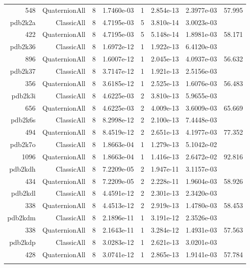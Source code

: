 \begin{xltabular}{\textwidth}{r|rcS[table-format=1.4e+2]cS[table-format=1.3e+2]S[table-format=1.4e+2]S[table-format=-1.3]}
548 & QuaternionAll & 8 & 1.7460e-03 & 1 & 2.854e-13 & 2.3977e-03 & 57.995\\  \addlinespace
pdb2k2a & ClassicAll & 8 & 4.7195e-03 & 5 & 3.810e-14 & 3.0023e-03 & \\
422 & QuaternionAll & 8 & 4.7195e-03 & 5 & 5.148e-14 & 1.8981e-03 & 58.171\\  \addlinespace
pdb2k36 & ClassicAll & 8 & 1.6972e-12 & 1 & 1.922e-13 & 6.4120e-03 & \\
896 & QuaternionAll & 8 & 1.6007e-12 & 1 & 2.045e-13 & 4.0937e-03 & 56.632\\  \addlinespace
pdb2k37 & ClassicAll & 8 & 3.7147e-12 & 1 & 1.921e-13 & 2.5156e-03 & \\
356 & QuaternionAll & 8 & 3.6185e-12 & 1 & 2.525e-13 & 1.6076e-03 & 56.483\\  \addlinespace
pdb2k3i & ClassicAll & 8 & 4.6225e-03 & 2 & 3.810e-13 & 5.9655e-03 & \\
656 & QuaternionAll & 8 & 4.6225e-03 & 2 & 4.009e-13 & 3.6009e-03 & 65.669\\  \addlinespace
pdb2k6s & ClassicAll & 8 & 8.2998e-12 & 2 & 2.100e-13 & 7.4448e-03 & \\
494 & QuaternionAll & 8 & 8.4519e-12 & 2 & 2.651e-13 & 4.1977e-03 & 77.352\\  \addlinespace
pdb2k7o & ClassicAll & 8 & 1.8663e-04 & 1 & 1.279e-13 & 5.1042e-02 & \\
1096 & QuaternionAll & 8 & 1.8663e-04 & 1 & 1.416e-13 & 2.6472e-02 & 92.816\\  \addlinespace
pdb2kdh & ClassicAll & 8 & 7.2209e-05 & 2 & 1.947e-11 & 3.1157e-03 & \\
434 & QuaternionAll & 8 & 7.2209e-05 & 2 & 2.228e-11 & 1.9604e-03 & 58.926\\  \addlinespace
pdb2kdl & ClassicAll & 8 & 4.4591e-12 & 2 & 2.301e-13 & 2.3420e-03 & \\
338 & QuaternionAll & 8 & 4.4513e-12 & 2 & 2.919e-13 & 1.4780e-03 & 58.453\\  \addlinespace
pdb2kdm & ClassicAll & 8 & 2.1896e-11 & 1 & 3.191e-12 & 2.3526e-03 & \\
338 & QuaternionAll & 8 & 2.1643e-11 & 1 & 3.284e-12 & 1.4931e-03 & 57.563\\  \addlinespace
pdb2kdp & ClassicAll & 8 & 3.0283e-12 & 1 & 2.621e-13 & 3.0201e-03 & \\
428 & QuaternionAll & 8 & 3.0741e-12 & 1 & 2.865e-13 & 1.9141e-03 & 57.784\\  \addlinespace

\end{xltabular}
